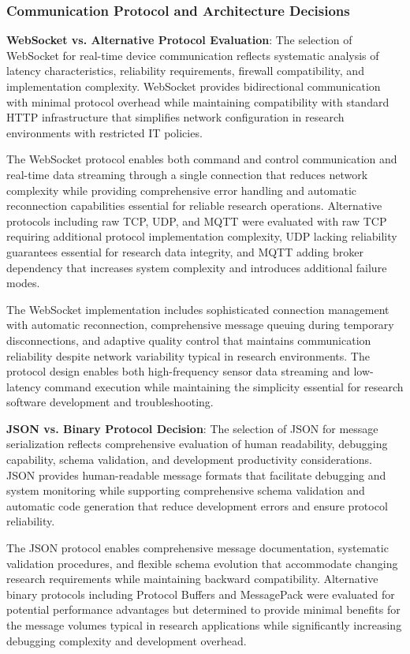 \documentclass[12pt,a4paper]{report}
\begin{document}
\subsubsection{Communication Protocol and Architecture Decisions}

\textbf{WebSocket vs. Alternative Protocol Evaluation}: The selection of WebSocket for real-time device communication
reflects systematic analysis of latency characteristics, reliability requirements, firewall compatibility, and
implementation complexity. WebSocket provides bidirectional communication with minimal protocol overhead while
maintaining compatibility with standard HTTP infrastructure that simplifies network configuration in research
environments with restricted IT policies.

The WebSocket protocol enables both command and control communication and real-time data streaming through a single
connection that reduces network complexity while providing comprehensive error handling and automatic reconnection
capabilities essential for reliable research operations. Alternative protocols including raw TCP, UDP, and MQTT were
evaluated with raw TCP requiring additional protocol implementation complexity, UDP lacking reliability guarantees
essential for research data integrity, and MQTT adding broker dependency that increases system complexity and introduces
additional failure modes.

The WebSocket implementation includes sophisticated connection management with automatic reconnection, comprehensive
message queuing during temporary disconnections, and adaptive quality control that maintains communication reliability
despite network variability typical in research environments. The protocol design enables both high-frequency sensor
data streaming and low-latency command execution while maintaining the simplicity essential for research software
development and troubleshooting.

\textbf{JSON vs. Binary Protocol Decision}: The selection of JSON for message serialization reflects comprehensive evaluation
of human readability, debugging capability, schema validation, and development productivity considerations. JSON
provides human-readable message formats that facilitate debugging and system monitoring while supporting comprehensive
schema validation and automatic code generation that reduce development errors and ensure protocol reliability.

The JSON protocol enables comprehensive message documentation, systematic validation procedures, and flexible schema
evolution that accommodate changing research requirements while maintaining backward compatibility. Alternative binary
protocols including Protocol Buffers and MessagePack were evaluated for potential performance advantages but determined
to provide minimal benefits for the message volumes typical in research applications while significantly increasing
debugging complexity and development overhead.
\end{document}
